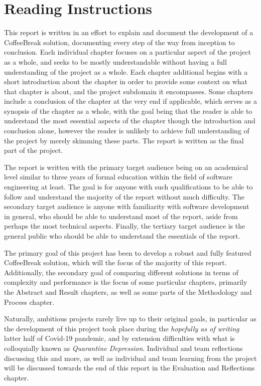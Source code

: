 \chapter{Reading Instructions}

This report is written in an effort to explain and document the development of a CoffeeBreak solution, documenting every step of the way from inception to conclusion. Each individual chapter focuses on a particular aspect of the project as a whole, and seeks to be mostly understandable without having a full understanding of the project as a whole. Each chapter additional begins with a short introduction about the chapter in order to provide some context on what that chapter is about, and the project subdomain it encompasses. Some chapters include a conclusion of the chapter at the very end if applicable, which serves as a synopsis of the chapter as a whole, with the goal being that the reader is able to understand the most essential aspects of the chapter though the introduction and conclusion alone, however the reader is unlikely to achieve full understanding of the project by merely skimming these parts. The report is written as the final part of the project.

The report is written with the primary target audience being on an academical level similar to three years of formal education within the field of software engineering at least. The goal is for anyone with such qualifications to be able to follow and understand the majority of the report without much difficulty. The secondary target audience is anyone with familiarity with software development in general, who should be able to understand most of the report, aside from perhaps the most technical aspects. Finally, the tertiary target audience is the general public who should be able to understand the essentials of the report.

The primary goal of this project has been to develop a robust and fully featured CoffeeBreak solution, which will the focus of the majority of this report. Additionally, the secondary goal of comparing different solutions in terms of complexity and performance is the focus of some particular chapters, primarily the Abstract and Result chapters, as well as some parts of the Methodology and Process chapter.

Naturally, ambitious projects rarely live up to their original goals, in particular as the development of this project took place during the \emph{hopefully as of writing} latter half of Covid-19 pandemic, and by extension difficulties with what is colloquially known as \textit{Quarantine Depression}. Individual and team reflections discussing this and more, as well as individual and team learning from the project will be discussed towards the end of this report in the Evaluation and Reflections chapter.

